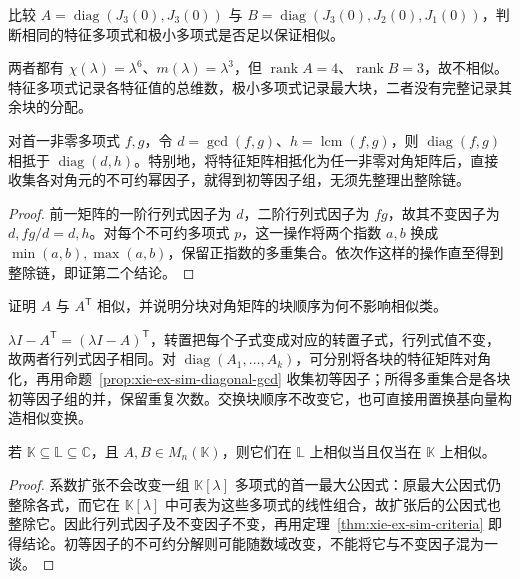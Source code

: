 \begin{example}
\label{ex:xie-ex-sim-char-min-insufficient}
比较 $A=\operatorname{diag}(J_3(0),J_3(0))$ 与 $B=\operatorname{diag}(J_3(0),J_2(0),J_1(0))$，判断相同的特征多项式和极小多项式是否足以保证相似。
\end{example}
\begin{solve}
两者都有 $\chi(\lambda)=\lambda^6$、$m(\lambda)=\lambda^3$，但 $\operatorname{rank}A=4$、$\operatorname{rank}B=3$，故不相似。特征多项式记录各特征值的总维数，极小多项式记录最大块，二者没有完整记录其余块的分配。
\end{solve}

\begin{proposition}
\label{prop:xie-ex-sim-diagonal-gcd}
对首一非零多项式 $f,g$，令 $d=\gcd(f,g)$、$h=\operatorname{lcm}(f,g)$，则 $\operatorname{diag}(f,g)$ 相抵于 $\operatorname{diag}(d,h)$。特别地，将特征矩阵相抵化为任一非零对角矩阵后，直接收集各对角元的不可约幂因子，就得到初等因子组，无须先整理出整除链。
\end{proposition}
\begin{proof}
前一矩阵的一阶行列式因子为 $d$，二阶行列式因子为 $fg$，故其不变因子为 $d,fg/d=d,h$。对每个不可约多项式 $p$，这一操作将两个指数 $a,b$ 换成 $\min(a,b),\max(a,b)$，保留正指数的多重集合。依次作这样的操作直至得到整除链，即证第二个结论。
\end{proof}

\begin{example}
证明 $A$ 与 $A^{\mathsf T}$ 相似，并说明分块对角矩阵的块顺序为何不影响相似类。
\end{example}
\begin{solve}
$\lambda I-A^{\mathsf T}=(\lambda I-A)^{\mathsf T}$，转置把每个子式变成对应的转置子式，行列式值不变，故两者行列式因子相同。对 $\operatorname{diag}(A_1,\ldots,A_k)$，可分别将各块的特征矩阵对角化，再用命题~\ref{prop:xie-ex-sim-diagonal-gcd} 收集初等因子；所得多重集合是各块初等因子组的并，保留重复次数。交换块顺序不改变它，也可直接用置换基向量构造相似变换。
\end{solve}

\begin{proposition}[相似性在数域扩张下不变]
\label{prop:xie-ex-sim-field-extension}
若 $\mathbb K\subseteq\mathbb L\subseteq\mathbb C$，且 $A,B\in M_n(\mathbb K)$，则它们在 $\mathbb L$ 上相似当且仅当在 $\mathbb K$ 上相似。
\end{proposition}
\begin{proof}
系数扩张不会改变一组 $\mathbb K[\lambda]$ 多项式的首一最大公因式：原最大公因式仍整除各式，而它在 $\mathbb K[\lambda]$ 中可表为这些多项式的线性组合，故扩张后的公因式也整除它。因此行列式因子及不变因子不变，再用定理~\ref{thm:xie-ex-sim-criteria} 即得结论。初等因子的不可约分解则可能随数域改变，不能将它与不变因子混为一谈。
\end{proof}

